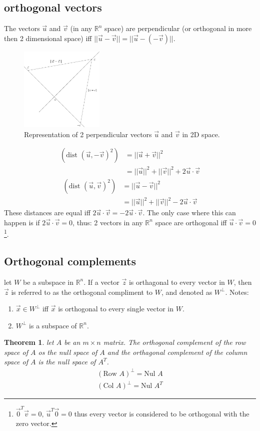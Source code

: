 \documentclass[11pt, a4paper]{article}
\newcommand*{\R}{\ensuremath{\mathbb{R}}}
\newtheorem{theorem}{Theorem}
\begin{document}
\subsection{orthogonal vectors}
The vectors $\vec{u}$ and $\vec{v}$ (in any $\R^n$ space) are perpendicular (or orthogonal in more then 2 dimensional space) iff $||\vec{u} - \vec{v}|| = ||\vec{u} - (-\vec{v})||$.
\begin{figure}[h]
  \centerline{\includegraphics[width=40mm]{images/Perp_vects.png}}  
  \caption{Representation of 2 perpendicular vectors $\vec{u}$ and $\vec{v}$ in 2D space.}
\end{figure}
\begin{align}
  (\text{dist }(\vec{u}, -\vec{v})^2) &= ||\vec{u} + \vec{v}||^2\\
                                      &= ||\vec{u}||^2 + ||\vec{v}||^2 + 2\vec{u}\cdot \vec{v}
\end{align}
\begin{align}
  (\text{dist }(\vec{u}, \vec{v})^2) &= ||\vec{u} - \vec{v}||^2\\
                                    &= ||\vec{u}||^2 + ||\vec{v}||^2 - 2\vec{u}\cdot \vec{v}
\end{align}
These distances are equal iff $2\vec{u}\cdot \vec{v} = -2\vec{u} \cdot \vec{v}$. The only case where this can happen is if $2\vec{u}\cdot \vec{v} = 0$, thus: 2 vectors in any $\R^n$ space are orthogonal iff $\vec{u} \cdot \vec{v} = 0$\footnote{$\vec{0}^T\vec{v}=0,\, \vec{u}^T\vec{0}=0$ thus every vector is considered to be orthogonal with the zero vector.}.

\subsection{Orthogonal complements}
let $W$ be a subspace in $\R^n$. If a vector $\vec{z}$ is orthagonal to every vector in $W$, then $\vec{z}$ is referred to as the orthogonal compliment to $W$, and denoted as $W^\bot$.
Notes:
\begin{enumerate}
  \item $\vec{x} \in W^\bot$ iff $\vec{x}$ is orthogonal to every single vector in $W$.
  \item $W^\bot$ is a subspace of $\R^n$.
\end{enumerate}
\begin{theorem}
  let $A$ be an $m \times n$ matrix. The orthogonal complement of the row space of $A$ os the null space of $A$ and the orthagonal complement of the column space of $A$ is the null space of $A^T$.
  \begin{gather}
    (\text{Row } A)^\bot = \text{Nul } A\\
    (\text{Col } A)^\bot = \text{Nul } A^T
  \end{gather}
\end{theorem}
\end{document}
